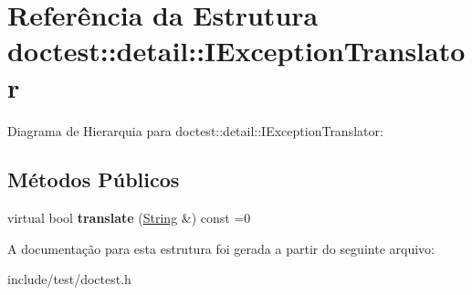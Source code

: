 \hypertarget{structdoctest_1_1detail_1_1IExceptionTranslator}{}\section{Referência da Estrutura doctest\+:\+:detail\+:\+:I\+Exception\+Translator}
\label{structdoctest_1_1detail_1_1IExceptionTranslator}


Diagrama de Hierarquia para doctest\+:\+:detail\+:\+:I\+Exception\+Translator\+:
\subsection*{Métodos Públicos}
\begin{DoxyCompactItemize}
\item 
\mbox{\label{structdoctest_1_1detail_1_1IExceptionTranslator_a9c56005e4c83c13b859cc2e31102bfbc}} 
virtual bool {\bfseries translate} (\hyperlink{classdoctest_1_1String}{String} \&) const =0
\end{DoxyCompactItemize}


A documentação para esta estrutura foi gerada a partir do seguinte arquivo\+:\begin{DoxyCompactItemize}
\item 
include/test/doctest.\+h\end{DoxyCompactItemize}
